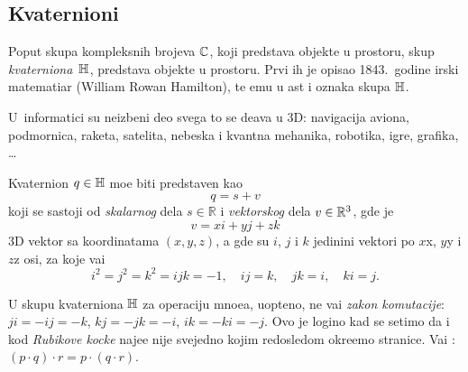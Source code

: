 \subsection{Kvaternioni}

\def\uv{{u}}
\def\vp{{v}}
\def\norm#1{{\vert#1\vert}}
\def\con#1{{\bar#1}}

Poput skupa kompleksnih brojeva ${\mathbb C}$, koji predstav{\lj}a objekte u  prostoru,
skup {\sl kvater\-niona\/}~${\mathbb H}$, predstav{\lj}a objekte u  prostoru. Prvi ih je opisao 
1843.\ godine irski ma\-te\-ma\-ti\-{\cv}ar
 (William Rowan Hamilton), te {\nj}emu u {\cv}ast i oznaka skupa ${\mathbb H}$.

U~informatici su neizbe{\zv}ni deo svega {\sv}to se de{\sv}ava u 3D:
navigacija aviona, pod\-mor\-nica, raketa, satelita,
nebeska i kvantna mehanika, robotika, igre, grafika, \dots

\medskip

Kvaternion $q\in{\mathbb H}$ mo{\zv}e biti predstav{\lj}en kao 
\begin{equation}
    q=s+\vp
\end{equation}
koji se sastoji od {\sl skalarnog\/} dela $s\in{\mathbb R}$ i {\sl vektorskog\/} dela $\vp\in\Rset^3$, gde je
\begin{equation}
    \vp=xi+yj+zk
\end{equation}
3D vektor sa koordinatama $(x,y,z)$, 
a gde su $i$, $j$ i $k$ jedini{\cv}ni vektori 
po $x$\idxaxis x, $y$\idxaxis y i $z$\idxaxis z osi,
za koje va{\zv}i
\begin{equation}\label{eq:qunits}
    i^2=j^2=k^2=ijk=-1,\quad
    ij=k,\quad jk=i,\quad ki=j. 
\end{equation}

\danger U skupu kvaterniona ${\mathbb H}$ za operaciju mno{\zv}e{\nj}a, uop{\sv}teno, ne va{\zv}i {\sl zakon komutacije}:
$ji=-ij=-k$, $kj=-jk=-i$, $ik=-ki=-j$.
Ovo je logi{\cv}no kad se setimo da i kod
{\sl Rubikove kocke\/} naj{\cv}e{\sv}{\cc}e nije svejedno kojim redosledom okre{\cc}emo stranice.
Va{\zv}i {\sl {}}: $(p\cdot q)\cdot r=p\cdot(q\cdot r)$.

\medskip

